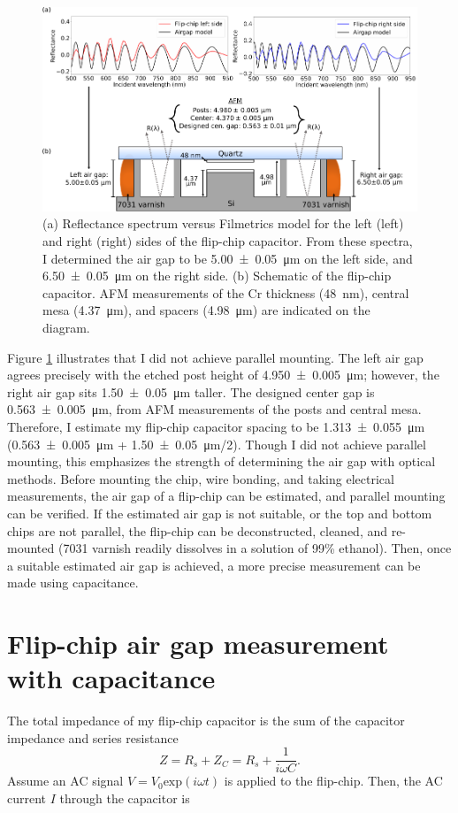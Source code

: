 \documentclass[double,12pt,1in,seploa]{beavtex}
\let\Oldsection\section
\renewcommand{\section}{\FloatBarrier\Oldsection}
\begin{document}
\begin{figure}
    \includegraphics[width = 1\textwidth]{Flip-chip capacitor reflectance summary.pdf}
    \caption{(a) Reflectance spectrum versus Filmetrics model for the left (left) and right (right) sides of the flip-chip capacitor. From these spectra, I determined the air gap to be \SI{5.00(5)}{\micro\meter} on the left side, and \SI{6.50(5)}{\micro\meter} on the right side. (b) Schematic of the flip-chip capacitor. AFM measurements of the Cr thickness (\SI{48}{\nano\meter}), central mesa (\SI{4.37}{\micro\meter}), and spacers (\SI{4.98}{\micro\meter}) are indicated on the diagram.}
    \label{FCCap Ref Summ}
\end{figure}
Figure \ref{FCCap Ref Summ} illustrates that I did not achieve parallel mounting. The left air gap agrees precisely with the etched post height of \SI{4.950(5)}{\micro\meter}; however, the right air gap sits \SI{1.50(5)}{\micro\meter} taller. The designed center gap is \SI{0.563(5)}{\micro\meter}, from AFM measurements of the posts and central mesa. Therefore, I estimate my flip-chip capacitor spacing to be \SI{1.313(55)}{\micro\meter} (\SI{0.563(5)}{\micro\meter} + \SI{1.50(5)}{\micro\meter}/2). Though I did not achieve parallel mounting, this emphasizes the strength of determining the air gap with optical methods. Before mounting the chip, wire bonding, and taking electrical measurements, the air gap of a flip-chip can be estimated, and parallel mounting can be verified. If the estimated air gap is not suitable, or the top and bottom chips are not parallel, the flip-chip can be deconstructed, cleaned, and re-mounted (7031 varnish readily dissolves in a solution of 99\% ethanol). Then, once a suitable estimated air gap is achieved, a more precise measurement can be made using capacitance.


\section{Flip-chip air gap measurement with capacitance}
The total impedance of my flip-chip capacitor is the sum of the capacitor impedance and series resistance
\begin{equation}
    Z = R_s + Z_C = R_s + \frac{1}{i\omega C}.
\end{equation}
Assume an AC signal $V = V_0 \mathrm{exp}(i\omega t)$ is applied to the flip-chip. Then, the AC current $I$ through the capacitor is 
\end{document}
